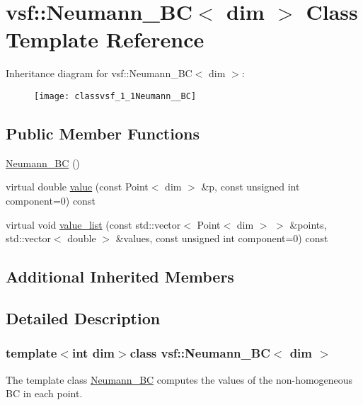 \hypertarget{classvsf_1_1Neumann__BC}{\section{vsf\-:\-:Neumann\-\_\-\-B\-C$<$ dim $>$ Class Template Reference}
\label{classvsf_1_1Neumann__BC}
}
Inheritance diagram for vsf\-:\-:Neumann\-\_\-\-B\-C$<$ dim $>$\-:\begin{figure}[H]
\begin{center}
\leavevmode
\texttt{[image: classvsf\_1\_1Neumann\_\_BC]}
\end{center}
\end{figure}
\subsection*{Public Member Functions}
\begin{DoxyCompactItemize}
\item 
\hyperlink{classvsf_1_1Neumann__BC_a8b36c26330ec21aa09f6887f1a49a329}{Neumann\-\_\-\-B\-C} ()
\item 
virtual double \hyperlink{classvsf_1_1Neumann__BC_addccdf65c1e5367b004289db3b0b96a5}{value} (const Point$<$ dim $>$ \&p, const unsigned int component=0) const 
\item 
virtual void \hyperlink{classvsf_1_1Neumann__BC_a2e1fe62899a58c70bbb4e9021858427e}{value\-\_\-list} (const std\-::vector$<$ Point$<$ dim $>$ $>$ \&points, std\-::vector$<$ double $>$ \&values, const unsigned int component=0) const 
\end{DoxyCompactItemize}
\subsection*{Additional Inherited Members}


\subsection{Detailed Description}
\subsubsection*{template$<$int dim$>$class vsf\-::\-Neumann\-\_\-\-B\-C$<$ dim $>$}

The template class \hyperlink{classvsf_1_1Neumann__BC}{Neumann\-\_\-\-B\-C} computes the values of the non-\/homogeneous B\-C in each point. 

